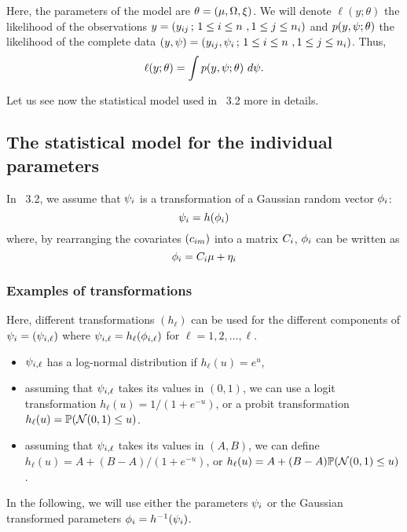 Here, the parameters of the model are $\thetag=(\fixed_effect,\IIV,\xi)$. We will denote
 $\ell(y;\theta)$ the likelihood of the observations $y =(y_{ij} \, ; \, 1  \leq i \leq n \ , 1
\leq j \leq n_i)$ and $p(y,\psi;\theta) $ the likelihood of the complete data $(y,\psi)= (y_{ij}, \psi_i \, ; \, 1
\leq i \leq n \ , 1 \leq j \leq n_i)$. Thus, $$\ell(y;\theta) = \int p(\yg,\psig;\theta)  \ d\psig .$$

Let us see now the statistical model used in \monolix~3.2 more in details.

\subsection{The statistical model for the individual parameters} \label{section_model_indiv}
In \monolix~3.2, we assume that ${\psi_i}$ is a transformation of a Gaussian random vector ${{\phi}_i}$:
\begin{equation} \label{prior2}
{\psi_i}=h({{\phi}_i})
\end{equation}
where, by rearranging the covariates $(c_{im})$ into a matrix $C_i$, ${{\phi}_i}$ can be written as
\begin{equation} \label{prior3}
\phigi=\Covariate_i \fixed_effect + \etagi
\end{equation}

\subsubsection{Examples of transformations}
Here, different transformations $(h_\ell)$ can be used for the different components of ${\psi_i}=({\psi_{i,\ell}})$ where ${\psi_{i,\ell}}=h_\ell({{\phi}_{i,\ell}})$ for $\ell=1, 2, \ldots , \ell$.
\begin{itemize}
\item ${\psi_{i,\ell}}$ has a log-normal distribution if $h_\ell(u)=e^u$,
\item assuming that ${\psi_{i,\ell}}$ takes its values in $(0,1)$, we can use a logit transformation $h_\ell(u)=1/(1+e^{-u})$, or a probit transformation $h_\ell(u)=\mathbb{P}\!\left({\cal N}(0,1)\leq u\right)$.
\item assuming that ${\psi_{i,\ell}}$ takes its values in $(A,B)$, we can define $h_\ell(u)=A + (B-A)/(1+e^{-u})$, or  $h_\ell(u)=A + (B-A)\mathbb{P}\!\left({\cal N}(0,1)\leq u\right)$.
    \end{itemize}

In the following, we will use either the parameters ${\psi_i}$ or the Gaussian transformed parameters ${{\phi}_i}=h^{-1}({\psi_i})$.

